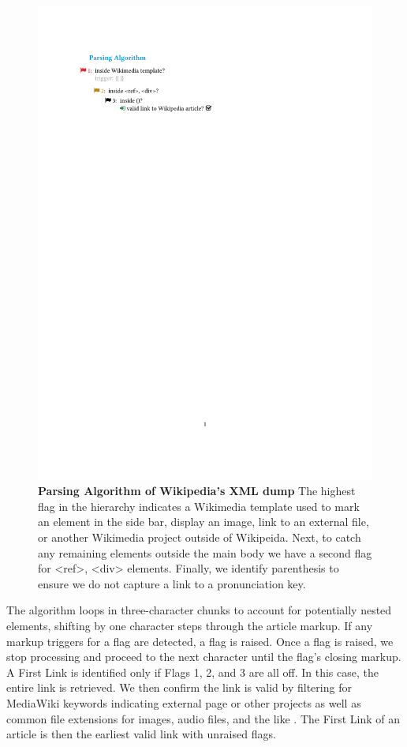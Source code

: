 \documentclass[pre,twocolumn,twoside,superscriptaddress,floatfix, aps, 10pt]{revtex4-1}
\begin{document}
\begin{figure}[tp!]
  \centering	
  \includegraphics[width=\columnwidth]{graphics/flags.pdf}  
  \caption{
    \textbf{Parsing Algorithm of Wikipedia's XML dump}
     The highest flag in the hierarchy indicates a Wikimedia template used to mark an element in the side bar, display an image, link to an external file, or another Wikimedia project outside of Wikipeida. Next, to catch any remaining elements outside the main body we have a second flag for <ref>, <div> elements. Finally, we identify parenthesis to ensure we do not capture a link to a pronunciation key.
  }
  \label{fig:parsing algorithm}
\end{figure}

The algorithm loops in three-character chunks to account for potentially nested elements, 
shifting by one character steps through the article markup.
If any markup triggers for a flag are detected, a flag is raised. 
Once a flag is raised, we stop processing and proceed to the next character
until the flag's closing markup.
A First Link is identified only if Flags 1, 2, and 3 are all off.
In this case, the entire link is retrieved. 
We then confirm the link is valid by filtering for MediaWiki keywords indicating external page or other projects
as well as common file extensions for 
images, audio files, and the like 
\cite{media_wiki_templates}.
The First Link of an article is then the earliest valid link with unraised flags.
\end{document}
